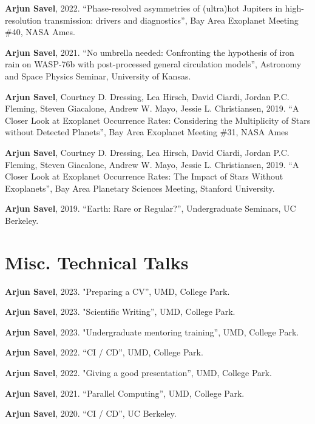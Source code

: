\documentclass[letterpaper,10.5pt]{article}
\newcommand{\shorterSection}[1]{\vspace{-10pt}\section{#1}}
\begin{document}
\begin{list}{}{\cvlist}
   \item[{\color{numcolor}\scriptsize5}] \textbf{Arjun Savel}, 2022. ``Phase-resolved asymmetries of (ultra)hot Jupiters in high-resolution transmission: drivers and diagnostics'', Bay Area Exoplanet Meeting \#40, NASA Ames.


\item[{\color{numcolor}\scriptsize4}] \textbf{Arjun Savel}, 2021. ``No umbrella needed: Confronting the hypothesis of iron rain on WASP-76b with post-processed general circulation models'', Astronomy and Space Physics Seminar, University of Kansas.



\item[{\color{numcolor}\scriptsize3}] \textbf{Arjun Savel}, Courtney D. Dressing, Lea Hirsch, David Ciardi, Jordan P.C. Fleming, Steven Giacalone, Andrew W. Mayo, Jessie L. Christiansen, 2019. “A Closer Look at Exoplanet Occurrence Rates: Considering the Multiplicity of Stars without Detected Planets”, Bay Area Exoplanet Meeting \#31, NASA Ames

\item[{\color{numcolor}\scriptsize2}] \textbf{Arjun Savel}, Courtney D. Dressing, Lea Hirsch, David Ciardi, Jordan P.C. Fleming, Steven Giacalone, Andrew W. Mayo, Jessie L. Christiansen, 2019. “A Closer Look at Exoplanet Occurrence Rates: The Impact of Stars Without Exoplanets”, Bay Area Planetary Sciences Meeting, Stanford University.

\item[{\color{numcolor}\scriptsize1}] \textbf{Arjun Savel}, 2019. “Earth: Rare or Regular?”, Undergraduate Seminars, UC Berkeley.

\end{list}

\shorterSection{Misc. Technical Talks}

\small
  \begin{list}{}{\cvlist}
\item[{\color{numcolor}\scriptsize7}] 
\textbf{Arjun Savel}, 2023. "Preparing a CV”, UMD, College Park.\item[{\color{numcolor}\scriptsize6}]
\textbf{Arjun Savel}, 2023. "Scientific Writing”, UMD, College Park.\item[{\color{numcolor}\scriptsize5}] \textbf{Arjun Savel}, 2023. "Undergraduate mentoring training”, UMD, College Park.
  \item[{\color{numcolor}\scriptsize4}] \textbf{Arjun Savel}, 2022. “CI / CD”, UMD, College Park.
  \item[{\color{numcolor}\scriptsize3}] \textbf{Arjun Savel}, 2022. "Giving a good presentation”, UMD, College Park.
  \item[{\color{numcolor}\scriptsize2}] \textbf{Arjun Savel}, 2021. “Parallel Computing”, UMD, College Park.
  \item[{\color{numcolor}\scriptsize1}] \textbf{Arjun Savel}, 2020. “CI / CD”, UC Berkeley.
  \end{list}
\end{document}
